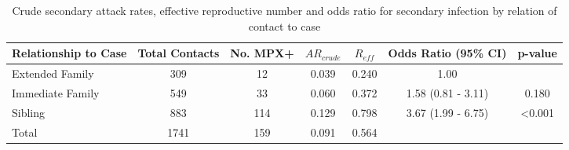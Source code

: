 
\begin{table}
\centering
    \caption{Crude secondary attack rates, effective reproductive number and odds ratio for secondary infection by relation of contact to case}
    \begin{tabular}{@{}lcccccc@{}}
    \toprule
    Relationship to Case & Total Contacts  & No. MPX+ & $AR_{crude}$ & $R_{eff}$ & Odds Ratio (95\% CI)  & p-value \\
    \midrule
  Extended Family   &  309   &   12   & 0.039 & 0.240 & 1.00               &  ~ \\
  Immediate Family  &  549   &   33   & 0.060 & 0.372 & 1.58 (0.81 - 3.11) & 0.180 \\
  Sibling           &  883   &   114  & 0.129 & 0.798 & 3.67 (1.99 - 6.75) & \textless0.001 \\
  Total             &  1741  &   159  & 0.091 & 0.564 & ~                 & ~ \\
    \bottomrule
    \end{tabular}
\end{table}

